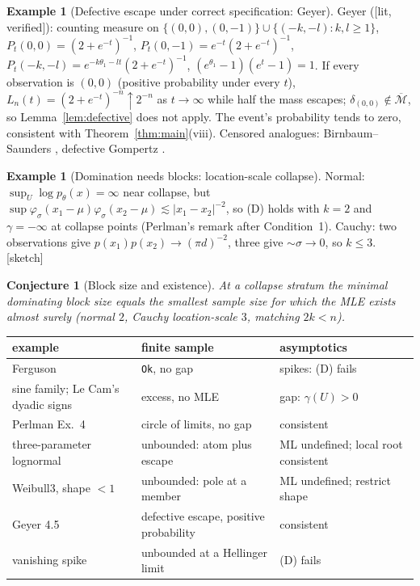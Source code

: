\documentclass[11pt]{article}
\newcommand{\bM}{\overline{\mathcal M}}
\newcommand{\status}[1]{\textsf{[#1]}}
\newtheorem{conjecture}[theorem]{Conjecture}
\theoremstyle{definition}
\newtheorem{example}[theorem]{Example}
\theoremstyle{remark}
\begin{document}
\begin{example}[Defective escape under correct specification: Geyer]\label{ex:geyer}
Geyer \cite[Example 4.5]{geyer} (\status{lit, verified}): counting measure on
$\{(0,0),(0,-1)\}\cup\{(-k,-l):k,l\ge1\}$,
$P_t(0,0)=(2+e^{-t})^{-1}$, $P_t(0,-1)=e^{-t}(2+e^{-t})^{-1}$,
$P_t(-k,-l)=e^{-k\theta_1-lt}(2+e^{-t})^{-1}$,
$(e^{\theta_1}-1)(e^t-1)=1$. If every observation is $(0,0)$ (positive
probability under every $t$), $L_n(t)=(2+e^{-t})^{-n}\uparrow2^{-n}$ as
$t\to\infty$ while half the mass escapes; $\delta_{(0,0)}\notin\bM$, so
Lemma~\ref{lem:defective} does not apply. The event's probability tends to
zero, consistent with Theorem~\ref{thm:main}(viii). Censored analogues:
Birnbaum--Saunders \cite{balzhu}, defective Gompertz \cite{calsavara}.
\end{example}

\begin{example}[Domination needs blocks: location-scale collapse]
Normal: $\sup_U\log p_\theta(x)=\infty$ near collapse, but
$\sup\varphi_\sigma(x_1-\mu)\varphi_\sigma(x_2-\mu)\lesssim|x_1-x_2|^{-2}$, so
(D) holds with $k=2$ and $\gamma=-\infty$ at collapse points (Perlman's
remark after Condition~1). Cauchy: two observations give
$p(x_1)p(x_2)\to(\pi d)^{-2}$, three give $\sim\sigma\to0$, so $k\le3$.
\status{sketch}
\end{example}

\begin{conjecture}[Block size and existence]
At a collapse stratum the minimal dominating block size equals the smallest
sample size for which the MLE exists almost surely (normal $2$, Cauchy
location-scale $3$, matching $2k<n$).
\end{conjecture}

\begin{center}\small
\begin{tabular}{@{}p{4.2cm}p{5.4cm}p{4.6cm}@{}}
\toprule
example & finite sample & asymptotics\\
\midrule
Ferguson & \texttt{Ok}, no gap & spikes: (D) fails\\
sine family; Le Cam's dyadic signs & excess, no MLE & gap: $\gamma(U)>0$\\
Perlman Ex.~4 & circle of limits, no gap & consistent\\
three-parameter lognormal & unbounded: atom plus escape & ML undefined; local root consistent\\
Weibull3, shape $<1$ & unbounded: pole at a member & ML undefined; restrict shape\\
Geyer 4.5 & defective escape, positive probability & consistent\\
vanishing spike & unbounded at a Hellinger limit & (D) fails\\
\bottomrule
\end{tabular}
\end{center}
\end{document}
